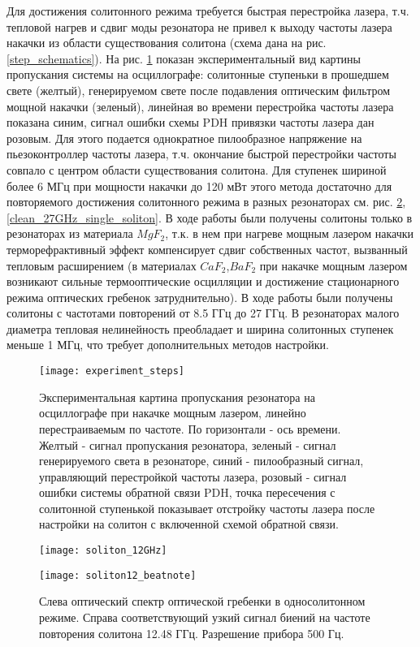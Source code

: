 Для достижения солитонного режима требуется быстрая перестройка лазера, т.ч. тепловой нагрев и сдвиг моды резонатора не привел к выходу частоты лазера накачки из области существования солитона (схема дана на рис. \ref{step_schematics}). На рис. \ref{experiment_steps} показан экспериментальный вид картины пропускания системы на осциллографе: солитонные ступеньки в прошедшем свете (желтый), генерируемом свете после подавления оптическим фильтром мощной накачки (зеленый), линейная во времени перестройка частоты лазера показана синим, сигнал ошибки схемы PDH привязки частоты лазера дан розовым. Для этого подается однократное пилообразное напряжение на пьезоконтроллер частоты лазера, т.ч. окончание быстрой перестройки частоты совпало с центром области существования солитона. Для ступенек шириной более 6 МГц при мощности накачки до 120 мВт этого метода достаточно для повторяемого достижения солитонного режима в разных резонаторах см. рис. \ref{soliton_12GHz},\ref{clean_27GHz_single_soliton}. В ходе работы были получены солитоны только в резонаторах из материала $MgF_2$, т.к. в нем при нагреве мощным лазером накачки терморефрактивный эффект компенсирует сдвиг собственных частот, вызванный тепловым расширением (в материалах $CaF_2$,$BaF_2$ при накачке мощным лазером возникают сильные термооптические осцилляции и достижение стационарного режима оптических гребенок затруднительно). В ходе работы были получены солитоны с частотами повторений от 8.5 ГГц до 27 ГГц. В резонаторах малого диаметра тепловая нелинейность преобладает и ширина солитонных ступенек меньше 1 МГц, что требует дополнительных методов настройки.

\begin{figure}[ht]
    \centering
    \texttt{[image: experiment\_steps]}
    \caption{Экспериментальная картина пропускания резонатора на осциллографе при накачке мощным лазером, линейно перестраиваемым по частоте. По горизонтали - ось времени. Желтый - сигнал пропускания резонатора, зеленый - сигнал генерируемого света в резонаторе, синий - пилообразный сигнал, управляющий перестройкой частоты лазера, розовый - сигнал ошибки системы обратной связи PDH, точка пересечения с солитонной ступенькой показывает отстройку частоты лазера после настройки на солитон с включенной схемой обратной связи.}
    \label{experiment_steps}
\end{figure}

\begin{figure}[ht]
  \begin{minipage}[ht]{0.49\linewidth}\centering
    \texttt{[image: soliton\_12GHz]}
  \end{minipage}
  \hfill
  \begin{minipage}[ht]{0.49\linewidth}\centering
    \texttt{[image: soliton12\_beatnote]}
  \end{minipage}
  \caption{Слева оптический спектр оптической гребенки в односолитонном режиме. Справа соответствующий узкий сигнал биений на частоте повторения солитона 12.48 ГГц. Разрешение прибора 500 Гц.}
  \label{soliton_12GHz}
\end{figure}


